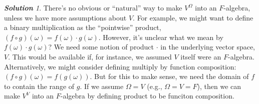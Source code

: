 \documentclass[11pt]{paper}
\theoremstyle{remark}
\newtheorem*{solution}{{\bf Solution}}
\newcommand\0{\ensuremath{\mathbf{0}}}
\newcommand{\<}{\ensuremath{\langle}}
\renewcommand{\>}{\ensuremath{\rangle}}
\begin{document}
\begin{solution}
There's no obvious or ``natural'' way to make  $V^\Omega$ into an
$F$-algebra, unless we have more assumptions about $V$.   For example, we might
want to define a binary multiplication as  the ``pointwise'' product, 
$(f\circ g)(\omega) = f(\omega) \cdot g(\omega)$. However, it's unclear what
we mean by $f(\omega) \cdot g(\omega)$?  We need some 
notion of product $\cdot$ in the underlying vector space, $V$.  This would be
available if, 
for instance, we assumed $V$ itself were an $F$-algebra.  Alternatively, we
might consider defining multiply by function composition: $(f\circ g)(\omega) =
f(g(\omega))$. But for this to make sense, we need the domain of $f$ to contain
the range of $g$. If we assume $\Omega = V$ (e.g., 
$\Omega = V = F$), then we can
make $V^V$ into an $F$-algebra by defining product to be funciton composition.

\end{solution}
\probskip
\end{document}
